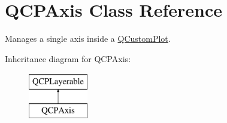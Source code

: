 \hypertarget{classQCPAxis}{\section{\-Q\-C\-P\-Axis \-Class \-Reference}
\label{classQCPAxis}
}


\-Manages a single axis inside a \hyperlink{classQCustomPlot}{\-Q\-Custom\-Plot}.  


\-Inheritance diagram for \-Q\-C\-P\-Axis\-:\begin{figure}[H]
\begin{center}
\leavevmode
\includegraphics[height=2.000000cm]{classQCPAxis}
\end{center}
\end{figure}
